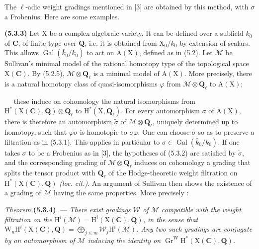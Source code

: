 \documentclass[11pt,leqno]{article}
\newcommand{\Page}[1]{\ifvmode\noindent\else\unskip\ \fi{\footnotesize\textcolor{gray}{[p.\,#1]}}\ \ignorespaces}
\begin{document}
The \(\ell\)-adic weight gradings mentioned in [3] are obtained by this method, with \(\sigma\) a Frobenius. Here are some examples.

\textbf{(5.3.3)} Let \(\mathrm{X}\) be a complex algebraic variety. It can be defined over a subfield \(k_0\) of \(\mathbf{C}\), of finite type over \(\mathbf{Q}\), i.e. it is obtained from \(\mathrm{X}_0/k_0\) by extension of scalars. This allows \(\operatorname{Gal}(\bar{k}_0/k_0)\) to act on \(\mathrm{A}(\mathrm{X})\), defined as in (5.2). Let \(\mathcal{M}\) be Sullivan's minimal model of the rational homotopy type of the topological space \(\mathrm{X}(\mathbf{C})\). By (5.2.5), \(\mathcal{M}\otimes\mathbf{Q}_{\ell}\) is a minimal model of \(\mathrm{A}(\mathrm{X})\). More precisely, there is a natural homotopy class of quasi-isomorphisms \(\varphi\) from \(\mathcal{M}\otimes\mathbf{Q}_{\ell}\) to \(\mathrm{A}(\mathrm{X})\);

\Page{241}
these induce on cohomology the natural isomorphisms from
\(\mathrm{H}^*(\mathrm{X}(\mathbf{C}),\mathbf{Q})\otimes\mathbf{Q}_\ell\)
to \(\mathrm{H}^*(\mathrm{X},\mathbf{Q}_\ell)\). For every automorphism
\(\sigma\) of \(\mathrm{A}(\mathrm{X})\), there is therefore an automorphism
\(\widetilde{\sigma}\) of \(\mathscr{M}\otimes\mathbf{Q}_\ell\), uniquely determined
up to homotopy, such that \(\varphi\widetilde{\sigma}\) is homotopic to
\(\sigma\varphi\). One can choose \(\widetilde{\sigma}\) so as to preserve
a filtration as in (5.3.1). This applies in particular to
\(\sigma\in\operatorname{Gal}(\bar{k}_0/k_0)\). If one takes \(\sigma\)
to be a Frobenius as in [3], the hypotheses of (5.3.2) are satisfied by
\(\widetilde{\sigma}\), and the corresponding grading of
\(\mathscr{M}\otimes\mathbf{Q}_\ell\) induces on cohomology a grading
that splits the tensor product with \(\mathbf{Q}_\ell\) of the
Hodge-theoretic weight filtration on
\(\mathrm{H}^*(\mathrm{X}(\mathbf{C}),\mathbf{Q})\)
\textit{(loc. cit.)}. An argument of Sullivan then shows the existence
of a grading of \(\mathscr{M}\) having the same properties. More
precisely :

\textit{Theorem} \textbf{(5.3.4)}. — \textit{There exist gradings
\(\mathscr{W}\) of \(\mathscr{M}\) compatible with the weight filtration
on the \(\mathrm{H}^i(\mathscr{M})=\mathrm{H}^i(\mathrm{X}(\mathbf{C}),\mathbf{Q})\),
in the sense that
\(\mathrm{W}_n\mathrm{H}^i(\mathrm{X}(\mathbf{C}),\mathbf{Q})
=\bigoplus\limits_{j\leq m}\mathscr{W}_j\mathrm{H}^i(\mathscr{M})\).
Any two such gradings are conjugate by an automorphism of
\(\mathscr{M}\) inducing the identity on
\(\operatorname{Gr}^{\mathrm{W}}\mathrm{H}^*(\mathrm{X}(\mathbf{C}),\mathbf{Q})\).}
\end{document}
